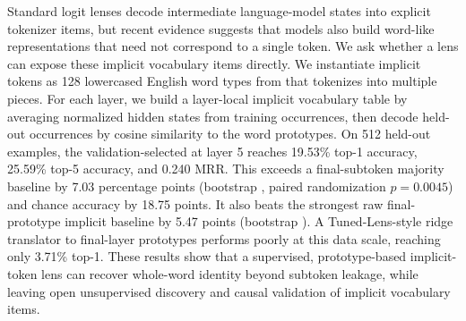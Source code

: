Standard logit lenses decode intermediate language-model states into explicit tokenizer items, but recent evidence suggests that models also build word-like representations that need not correspond to a single token. We ask whether a lens can expose these implicit vocabulary items directly. We instantiate implicit tokens as 128 lowercased English word types from \wikitext that \qwen tokenizes into multiple pieces. For each layer, we build a layer-local implicit vocabulary table by averaging normalized hidden states from training occurrences, then decode held-out occurrences by cosine similarity to the word prototypes. On 512 held-out examples, the validation-selected \itl at layer 5 reaches 19.53\% top-1 accuracy, 25.59\% top-5 accuracy, and 0.240 MRR. This exceeds a final-subtoken majority baseline by 7.03 percentage points (bootstrap \ci [2.53, 11.72], paired randomization $p=0.0045$) and chance accuracy by 18.75 points. It also beats the strongest raw final-prototype implicit baseline by 5.47 points (bootstrap \ci [2.15, 8.79]). A Tuned-Lens-style ridge translator to final-layer prototypes performs poorly at this data scale, reaching only 3.71\% top-1. These results show that a supervised, prototype-based implicit-token lens can recover whole-word identity beyond subtoken leakage, while leaving open unsupervised discovery and causal validation of implicit vocabulary items.
